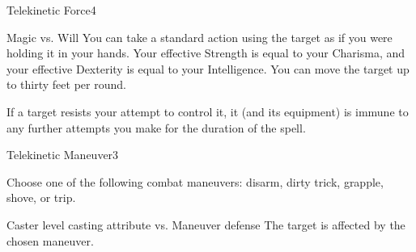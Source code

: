 \begin{spellsection}{Telekinetic Force}{4}
\begin{spellheader}
\end{spellheader}
\begin{spellcontent}
    \begin{spelltargetinginfo}
    \end{spelltargetinginfo}
    \begin{spelleffects}
        \begin{spellattack}{Magic vs. Will}
            \spellsuccess You can take a standard action using the target as if you were holding it in your hands. Your effective Strength is equal to your Charisma, and your effective Dexterity is equal to your Intelligence. You can move the target up to thirty feet per round.
        \end{spellattack}
    \end{spelleffects}
\end{spellcontent}
\begin{spellfooter}
    \spellnotes If a target resists your attempt to control it, it (and its equipment) is immune to any further attempts you make for the duration of the spell.
\end{spellfooter}
\end{spellsection}

\begin{spellsection}{Telekinetic Maneuver}{3}
\begin{spellheader}
\end{spellheader}
\begin{spellcontent}
    \begin{spelltargetinginfo}
    \end{spelltargetinginfo}
    \begin{spelleffects}
        \spellspecial Choose one of the following combat maneuvers: disarm, dirty trick, grapple, shove, or trip.
        \begin{spellattack}{Caster level \add casting attribute vs. Maneuver defense}
            \spellsuccess The target is affected by the chosen maneuver.
        \end{spellattack}
    \end{spelleffects}
\end{spellcontent}
\begin{spellfooter}
\end{spellfooter}
\end{spellsection}

